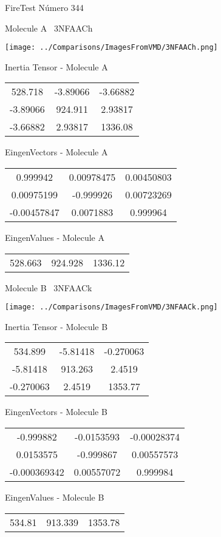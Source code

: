 \vtab[-3cm]
\begin{center}
{\large FireTest \tab Número 344}
\end{center}
\begin{multicols}{2}
\begin{center}

Molecule A \
3NFAACh

\texttt{[image: ../Comparisons/ImagesFromVMD/3NFAACh.png]}

Inertia Tensor - Molecule A \\
\begin{tabular}{|c c c|}
528.718	 & 	-3.89066	 & 	-3.66882	 \\
-3.89066	 & 	924.911	 & 	2.93817	 \\
-3.66882	 & 	2.93817	 & 	1336.08
\end{tabular}

\vtab
 EingenVectors - Molecule A     \\
\begin{tabular}{|c c c|}
0.999942	 & 	0.00978475	 & 	0.00450803	 \\
0.00975199	 & 	-0.999926	 & 	0.00723269	 \\
-0.00457847	 & 	0.0071883	 & 	0.999964
\end{tabular}

\vtab
 EingenValues - Molecule A     \\
\begin{tabular}{|c c c|}
528.663	 & 	924.928	 & 	1336.12	 \\
\end{tabular}
\columnbreak

Molecule B \
3NFAACk

\texttt{[image: ../Comparisons/ImagesFromVMD/3NFAACk.png]}

Inertia Tensor - Molecule B \\
\begin{tabular}{|c c c|}
534.899	 & 	-5.81418	 & 	-0.270063	 \\
-5.81418	 & 	913.263	 & 	2.4519	 \\
-0.270063	 & 	2.4519	 & 	1353.77
\end{tabular}

\vtab
 EingenVectors - Molecule B     \\
\begin{tabular}{|c c c|}
-0.999882	 & 	-0.0153593	 & 	-0.00028374	 \\
0.0153575	 & 	-0.999867	 & 	0.00557573	 \\
-0.000369342	 & 	0.00557072	 & 	0.999984
\end{tabular}

\vtab
 EingenValues - Molecule B     \\
\begin{tabular}{|c c c|}
534.81	 & 	913.339	 & 	1353.78	 \\
\end{tabular}

\end{center}
\end{multicols}

